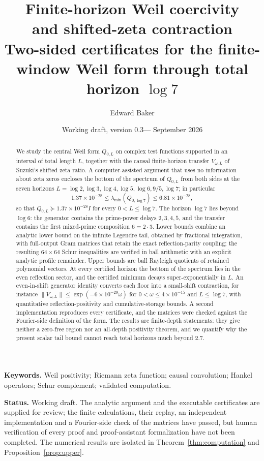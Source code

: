 \documentclass[11pt]{article}
\title{Finite-horizon Weil coercivity\protect\\ and shifted-zeta contraction\protect\\[5pt]
\large Two-sided certificates for the finite-window Weil form through total horizon $\log 7$}
\author{Edward Baker}
\date{Working draft, version 0.3\quad---\quad 9 September 2026}
\numberwithin{equation}{section}
\theoremstyle{definition}
\theoremstyle{remark}
\newcommand{\norm}[1]{\lVert#1\rVert}
\begin{document}
\maketitle
\begin{abstract}
We study the central Weil form $Q_{0,L}$ on complex test functions supported
in an interval of total length $L$, together with the causal finite-horizon
transfer $V_{\omega,L}$ of Suzuki's shifted zeta ratio. A computer-assisted
argument that uses no information about zeta zeros encloses the bottom of the
spectrum of $Q_{0,L}$ from both sides at the seven horizons
$L=\log2,\log3,\log4,\log5,\log6,9/5,\log7$; in particular
\[
 1.37\times10^{-28}\le\lambda_{\min}(Q_{0,\log7})\le6.81\times10^{-28},
\]
so that $Q_{0,L}\succeq1.37\times10^{-28}I$ for every $0<L\le\log7$. The
horizon $\log7$ lies beyond $\log6$: the generator contains the prime-power
delays $2,3,4,5$, and the transfer contains the first mixed-prime composition
$6=2\cdot3$. Lower bounds combine an analytic lower bound on the infinite
Legendre tail, obtained by fractional integration, with full-output Gram
matrices that retain the exact reflection-parity coupling; the resulting
$64\times64$ Schur inequalities are verified in ball arithmetic with an
explicit analytic profile remainder. Upper bounds are ball Rayleigh quotients
of retained polynomial vectors. At every certified horizon the bottom of the
spectrum lies in the even reflection sector, and the certified minimum decays
super-exponentially in $L$. An even-in-shift generator identity converts each
floor into a small-shift contraction, for instance
$\norm{V_{\omega,L}}\le\exp(-6\times10^{-29}\omega)$ for
$0<\omega\le4\times10^{-15}$ and $L\le\log7$, with quantitative
reflection-positivity and cumulative-storage bounds. A second implementation
reproduces every certificate, and the matrices were checked against the
Fourier-side definition of the form. The results are finite-depth statements:
they give neither a zero-free region nor an all-depth positivity theorem, and
we quantify why the present scalar tail bound cannot reach total horizons much
beyond $2.7$.
\end{abstract}

\noindent\textbf{Keywords.} Weil positivity; Riemann zeta function; causal
convolution; Hankel operators; Schur complement; validated computation.

\smallskip
\noindent\textbf{Status.} Working draft. The analytic argument and the
executable certificates are supplied for review; the finite calculations,
their replay, an independent implementation and a Fourier-side check of the
matrices have passed, but human verification of every proof and proof-assistant
formalization have not been completed. The numerical results are isolated in
Theorem~\ref{thm:computation} and Proposition~\ref{prop:upper}.
\end{document}
